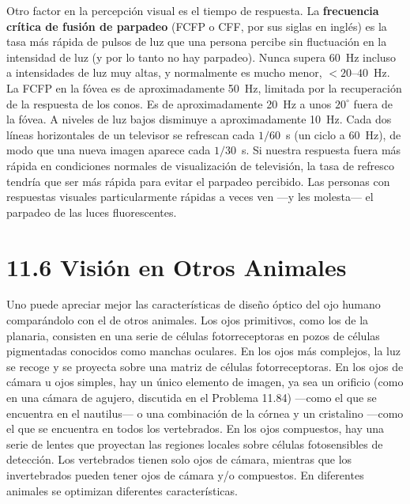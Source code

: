 \documentclass[12pt]{book}
\begin{document}
Otro factor en la percepción visual es el tiempo de respuesta. La \textbf{frecuencia crítica de fusión de parpadeo} (FCFP o CFF, por sus siglas en inglés) es la tasa más rápida de pulsos de luz que una persona percibe sin fluctuación en la intensidad de luz (y por lo tanto no hay parpadeo). Nunca supera 60~Hz incluso a intensidades de luz muy altas, y normalmente es mucho menor, $<20\text{--}40$~Hz. La FCFP en la fóvea es de aproximadamente 50~Hz, limitada por la recuperación de la respuesta de los conos. Es de aproximadamente 20~Hz a unos $20^\circ$ fuera de la fóvea. A niveles de luz bajos disminuye a aproximadamente 10~Hz. Cada dos líneas horizontales de un televisor se refrescan cada $1/60$~s (un ciclo a 60~Hz), de modo que una nueva imagen aparece cada $1/30$~s. Si nuestra respuesta fuera más rápida en condiciones normales de visualización de televisión, la tasa de refresco tendría que ser más rápida para evitar el parpadeo percibido. Las personas con respuestas visuales particularmente rápidas a veces ven ---y les molesta--- el parpadeo de las luces fluorescentes.


\section{11.6 Visión en Otros Animales}

Uno puede apreciar mejor las características de diseño óptico del ojo humano comparándolo con el de otros animales. Los ojos primitivos, como los de la planaria, consisten en una serie de células fotorreceptoras en pozos de células pigmentadas conocidos como manchas oculares. En los ojos más complejos, la luz se recoge y se proyecta sobre una matriz de células fotorreceptoras. En los ojos de cámara u ojos simples, hay un único elemento de imagen, ya sea un orificio (como en una cámara de agujero, discutida en el Problema 11.84) ---como el que se encuentra en el nautilus--- o una combinación de la córnea y un cristalino ---como el que se encuentra en todos los vertebrados. En los ojos compuestos, hay una serie de lentes que proyectan las regiones locales sobre células fotosensibles de detección. Los vertebrados tienen solo ojos de cámara, mientras que los invertebrados pueden tener ojos de cámara y/o compuestos. En diferentes animales se optimizan diferentes características.
\end{document}
